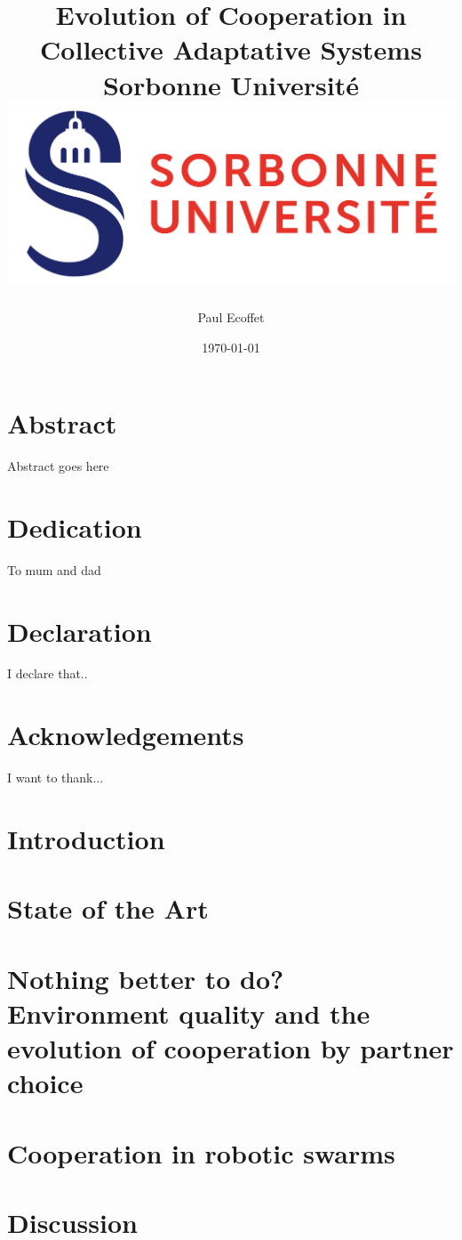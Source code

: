\documentclass[12pt,a4paper]{report}
\title{
{Evolution of Cooperation in Collective Adaptative Systems}\\
{\large Sorbonne Université}\\
{\includegraphics[width=\textwidth]{university.png}}
}
\author{Paul Ecoffet}
\date{\today}
\begin{document}
\maketitle

\chapter*{Abstract}
Abstract goes here

\chapter*{Dedication}
To mum and dad

\chapter*{Declaration}
I declare that..

\chapter*{Acknowledgements}
I want to thank...

\tableofcontents

\chapter{Introduction}


\chapter{State of the Art}


\chapter{Nothing better to do? Environment quality and the evolution of cooperation by partner choice}


\chapter{Cooperation in robotic swarms}


\chapter{Discussion}


\printbibliography
\end{document}
